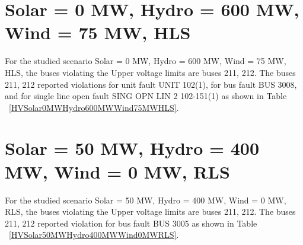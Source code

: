 \documentclass[10pt]{report}
\begin{document}
\section{Solar = 0 MW, Hydro = 600 MW, Wind = 75 MW, HLS}
For the studied scenario Solar = 0 MW, Hydro = 600 MW, Wind = 75 MW, HLS, the buses violating the Upper voltage limits are buses 211, 212.
The buses 211, 212 reported violations for unit fault UNIT 102(1), for bus fault BUS 3008, and for single line open fault SING OPN LIN   2 102-151(1) as shown in Table ~\ref{HVSolar0MWHydro600MWWind75MWHLS}.
\begin{table}[H]
\caption{Contingencies reporting bus voltages greater than emergency voltage of 1.1 PU for scenario Solar = 0 MW, Hydro = 600 MW, Wind = 75 MW, HLS}
\label{HVSolar0MWHydro600MWWind75MWHLS}
\centering
{}
\end{table}


\section{Solar = 50 MW, Hydro = 400 MW, Wind = 0 MW, RLS}
For the studied scenario Solar = 50 MW, Hydro = 400 MW, Wind = 0 MW, RLS, the buses violating the Upper voltage limits are buses 211, 212.
The buses 211, 212 reported violation for bus fault BUS 3005 as shown in Table ~\ref{HVSolar50MWHydro400MWWind0MWRLS}.
\begin{table}[H]
\caption{Contingencies reporting bus voltages greater than emergency voltage of 1.1 PU for scenario Solar = 50 MW, Hydro = 400 MW, Wind = 0 MW, RLS}
\label{HVSolar50MWHydro400MWWind0MWRLS}
\centering
{}
\end{table}
\end{document}
